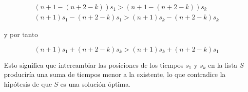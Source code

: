 \documentclass[a4]{article}
\begin{document}
\vspace{-15mm}

\begin{align*}    
  (n+1-(n+2-k))s_1 > (n+1-(n+2-k))s_k \\
  (n+1)s_1 - (n+2-k)s_1 > (n+1)s_k - (n+2-k)s_k
\end{align*}

y por tanto

\[(n+1)s_1 + (n+2-k)s_k > (n+1)s_k + (n+2-k)s_1\]

Esto significa que intercambiar las posiciones de los tiempos $s_1$ y
$s_k$ en la lista $S$ produciría una suma de tiempos menor a la
existente, lo que contradice la hipótesis de que $S$ es una solución
óptima.

\hfill\qedsymbol
\end{document}
